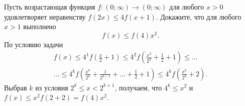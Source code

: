 \problem
Пусть возрастающая функция $f \colon (0; \infty) \to (0; \infty)$ для любого
$x > 0$ удовлетворяет неравенству $f(2 x) \leq  4 f(x + 1)$.
Докажите, что для любого $x > 1$ выполнено
\[
    f(x) \leq f(4) x^2
.\]
\solution
По условию задачи
\begin{gather*}
    f(x)
\leq
    4^1 f\left(\frac{x}{2} + 1 \right)
\leq
    4^2 f\left(\frac{x^2}{2^2} + \frac{1}{2} + 1\right)
\leq\ldots\\\ldots\leq
    4^k f\left(
        \frac{x^k}{2^k} + \frac{1}{2^{k-1}} + \ldots + \frac{1}{2} + 1
    \right)
\leq
    4^k f\left(\frac{x^k}{2^k} + 2\right)
.\end{gather*}
Выбрав $k$ из условия $2^k \leq x < 2^{k + 1}$, получаем, что $4^k \leq x^2$ и
$f(x) \leq x^2 f(2 + 2) = f(4) x^2$.
\endproblem
